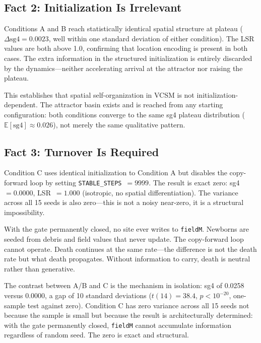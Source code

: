 \documentclass[11pt,twocolumn]{article}
\begin{document}
\subsection{Fact 2: Initialization Is Irrelevant}

Conditions A and B reach statistically identical spatial structure at plateau
($\Delta\text{sg4} = 0.0023$, well within one standard deviation of either condition).
The LSR values are both above 1.0, confirming that location encoding is present
in both cases. The extra information in the structured initialization is entirely
discarded by the dynamics---neither accelerating arrival at the attractor nor
raising the plateau.

This establishes that spatial self-organization in VCSM is not initialization-dependent.
The attractor basin exists and is reached from any starting configuration: both conditions
converge to the same sg4 plateau distribution ($\mathbb{E}[\text{sg4}] \approx 0.026$),
not merely the same qualitative pattern.

\subsection{Fact 3: Turnover Is Required}

Condition C uses identical initialization to Condition A but disables the
copy-forward loop by setting \texttt{STABLE\_STEPS}~$= 9999$. The result is
exact zero: sg4~$= 0.0000$, LSR~$= 1.000$ (isotropic, no spatial differentiation).
The variance across all 15 seeds is also zero---this is not a noisy near-zero,
it is a structural impossibility.

With the gate permanently closed, no site ever writes to \texttt{fieldM}. Newborns
are seeded from debris and field values that never update. The copy-forward loop
cannot operate. Death continues at the same rate---the difference is not the
death rate but what death propagates. Without information to carry, death is
neutral rather than generative.

The contrast between A/B and C is the mechanism in isolation: sg4 of 0.0258
versus 0.0000, a gap of 10 standard deviations ($t(14) = 38.4$,
$p < 10^{-20}$, one-sample test against zero). Condition C has zero variance
across all 15 seeds not because the sample is small but because the result is
architecturally determined: with the gate permanently closed, \texttt{fieldM}
cannot accumulate information regardless of random seed. The zero is exact and
structural.
\end{document}
